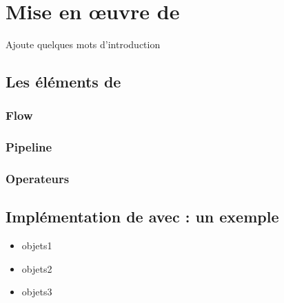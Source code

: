 
\chapter{Mise en \oe{}uvre de \PpFf}
\label{implementation.chap}


Ajoute quelques mots d’introduction


\section{Les \'el\'ements de }

\subsection{Flow}
\subsection{Pipeline}
\subsection{Operateurs}


\section{Impl\'ementation de  avec  : un exemple}


\begin{itemize}

\item objets1 

\item objets2 

\item objets3 


\end{itemize}
